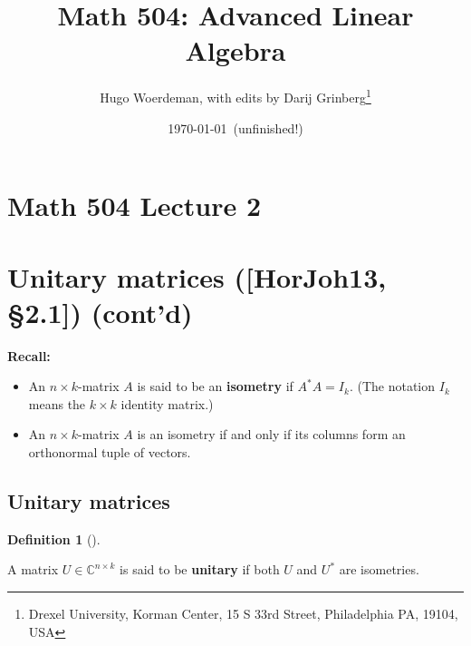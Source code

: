 \documentclass[numbers=enddot,12pt,final,onecolumn,notitlepage]{scrartcl}%
\numberwithin{exer}{subsection}
\theoremstyle{definition}
\newtheorem{defi}[theo]{Definition}
\newenvironment{definition}[1][]
{\begin{defi}[#1]\begin{leftbar}}
{\end{leftbar}\end{defi}}
\begin{document}
\title{Math 504: Advanced Linear Algebra}
\author{Hugo Woerdeman, with edits by Darij Grinberg\thanks{Drexel University, Korman
Center, 15 S 33rd Street, Philadelphia PA, 19104, USA}}
\date{\today\ (unfinished!)}
\maketitle
\tableofcontents

\section*{Math 504 Lecture 2}

\section{Unitary matrices ([HorJoh13, \S 2.1]) (cont'd)}

\textbf{Recall:}

\begin{itemize}
\item An $n\times k$-matrix $A$ is said to be an \textbf{isometry} if
$A^{\ast}A=I_{k}$. (The notation $I_{k}$ means the $k\times k$ identity matrix.)

\item An $n\times k$-matrix $A$ is an isometry if and only if its columns form
an orthonormal tuple of vectors.
\end{itemize}

\subsection{Unitary matrices}

\begin{definition}
A matrix $U\in\mathbb{C}^{n\times k}$ is said to be \textbf{unitary} if both
$U$ and $U^{\ast}$ are isometries.
\end{definition}
\end{document}
